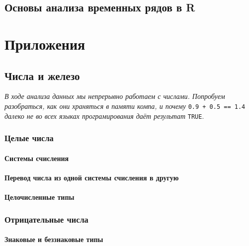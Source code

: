 \documentclass[
  letterpaper,
]{scrbook}
\theoremstyle{definition}
\theoremstyle{remark}
\begin{document}

\chapter{Основы анализа временных рядов в R}\label{randan-timeseries}

\part{Приложения}


\chapter{Числа и железо}\label{appendix_numbers}

\emph{В ходе анализа данных мы непрерывно работаем с числами. Попробуем
разобраться, как они храняться в памяти компа, и почему}
\texttt{0.9\ +\ 0.5\ ==\ 1.4} \emph{далеко не во всех языках
програмирования даёт результат} \texttt{TRUE}.

\section{Целые числа}\label{integer_iron}

\subsection{Системы счисления}\label{number_systems}

\subsection{Перевод числа из одной системы счисления в
другую}\label{system_to_system}

\subsection{Целочисленные типы}\label{integer_types}

\section{Отрицательные числа}\label{negative_iron}

\subsection{Знаковые и беззнаковые типы}\label{unsigned_type}
\end{document}
